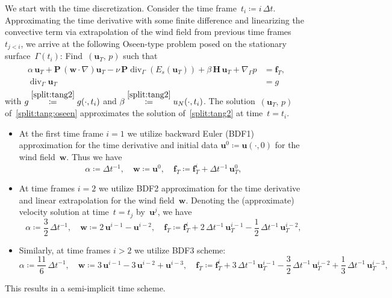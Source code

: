 \documentclass[12pt]{article}
\newcommand{\vect}[1]{\boldsymbol{\mathbf{#1}}}
\DeclareMathOperator{\Div}{div}
\begin{document}
We start with the time discretization. Consider the time frame~$t_i \coloneqq i\,\Delta t$. Approximating the time derivative with some finite difference and linearizing the convective term via extrapolation of the wind field from previous time frames $t_{j<i}$, we arrive at the following Oseen-type problem posed on the stationary surface~$\Gamma(t_i)$: Find~$(\vect u_T,\,p)$ such that
\begin{align}\begin{split}\label{split:tang:oseen}
	\alpha\,\vect u_T + \vect P\,(\vect w\cdot\nabla)\vect u_T - \nu\,\vect P\Div_\Gamma(E_s(\vect u_T)) + \beta\,\vect H\,\vect u_T + \nabla_\Gamma p &= \vect f_T,\\
	\Div_\Gamma \vect u_T &= g
\end{split}\end{align}
with $g \stackrel{\eqref{split:tang2}}{\coloneqq} g(\cdot, t_i)$ and $\beta \stackrel{\eqref{split:tang2}}{\coloneqq} u_N(\cdot, t_i)$. The solution~$(\vect u_T,\,p)$ of~\eqref{split:tang:oseen} approximates the solution of~\eqref{split:tang2} at time~$t = t_i$.
\begin{itemize}
	\item At the first time frame $i = 1$ we utilize backward Euler (BDF1) approximation for the time derivative and initial data $\vect u^0 \coloneqq \vect u(\cdot, 0)$ for the wind field~$\vect w$. Thus we have
	\begin{equation*}
		\alpha \coloneqq \Delta t^{-1},\quad
		\vect w \coloneqq \vect u^0,\quad
		\vect f_T \coloneqq \vect f_T^i + \Delta t^{-1}\,\vect u_T^0,
	\end{equation*}
	\item At time frames $i = 2$ we utilize BDF2 approximation for the time derivative and linear extrapolation for the wind field~$\vect w$. Denoting the (approximate) velocity solution at time~$t = t_j$ by~$\vect u^j$, we have
	\begin{equation*}
		\alpha \coloneqq \frac 32\,\Delta t^{-1},\quad
		\vect w \coloneqq 2\,\vect u^{i-1} - \vect u^{i-2},\quad
		\vect f_T \coloneqq \vect f_T^i + 2\,\Delta t^{-1}\,\vect u_T^{i-1} - \frac 12\,\Delta t^{-1}\,\vect u_T^{i-2},
	\end{equation*}
	\item Similarly, at time frames $i > 2$ we utilize BDF3 scheme:
	\begin{equation*}
		\alpha \coloneqq \frac{11}{6}\,\Delta t^{-1},\quad
		\vect w \coloneqq 3\,\vect u^{i-1} - 3\,\vect u^{i-2} + \vect u^{i-3},\quad
		\vect f_T \coloneqq \vect f_T^i + 3\,\Delta t^{-1}\,\vect u_T^{i-1} - \frac 32\,\Delta t^{-1}\,\vect u_T^{i-2} + \frac 13\,\Delta t^{-1}\,\vect u_T^{i-3},
	\end{equation*}
\end{itemize}
This results in a semi-implicit time scheme.
\end{document}
